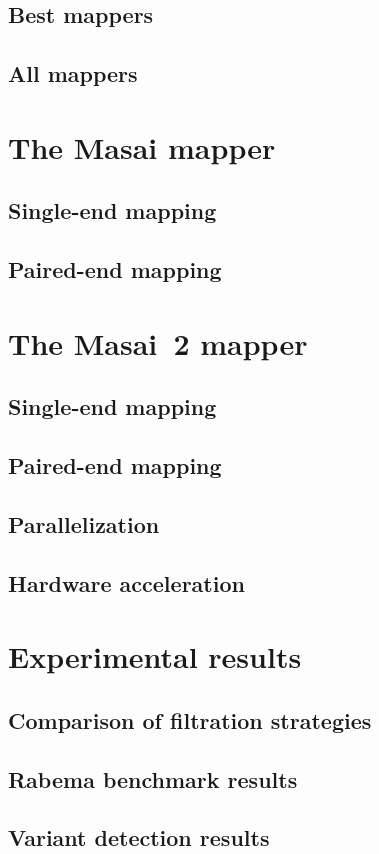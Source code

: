 \subsection{Best mappers}
\subsection{All mappers}
\section{The Masai mapper}
\subsection{Single-end mapping}
\subsection{Paired-end mapping}
\section{The Masai~2 mapper}
\subsection{Single-end mapping}
\subsection{Paired-end mapping}
\subsection{Parallelization}
\subsection{Hardware acceleration}
\section{Experimental results}
\subsection{Comparison of filtration strategies}
\subsection{Rabema benchmark results}
\subsection{Variant detection results}
